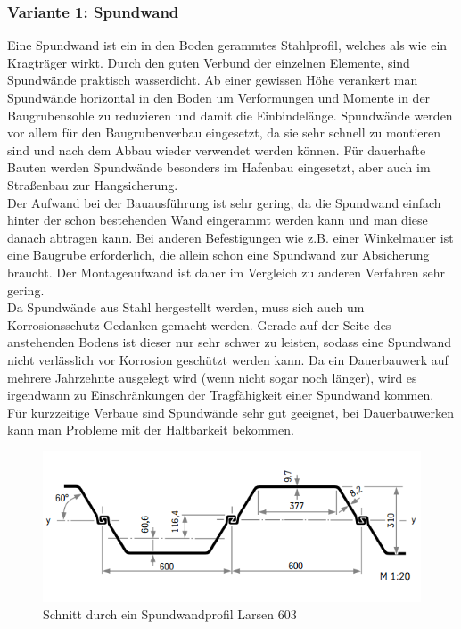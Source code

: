 \documentclass[11pt,fleqn,a4paper,halfparskip]{article}
\begin{document}
\subsubsection*{Variante 1: Spundwand} 
Eine Spundwand ist ein in den Boden gerammtes Stahlprofil, welches als wie ein Kragträger wirkt. Durch den guten Verbund der einzelnen Elemente, sind Spundwände praktisch wasserdicht. Ab einer gewissen Höhe verankert man Spundwände horizontal in den Boden um Verformungen und Momente in der Baugrubensohle zu reduzieren und damit die Einbindelänge. Spundwände werden vor allem für den Baugrubenverbau eingesetzt, da sie sehr schnell zu montieren sind und nach dem Abbau wieder verwendet werden können. Für dauerhafte Bauten werden Spundwände besonders im Hafenbau eingesetzt, aber auch im Straßenbau zur Hangsicherung. \\
Der Aufwand bei der Bauausführung ist sehr gering, da die Spundwand einfach hinter der schon bestehenden Wand eingerammt werden kann und man diese danach abtragen kann. Bei anderen Befestigungen wie z.B. einer Winkelmauer ist eine Baugrube erforderlich, die allein schon eine Spundwand zur Absicherung braucht. Der Montageaufwand ist daher im Vergleich zu anderen Verfahren sehr gering. \\
Da Spundwände aus Stahl hergestellt werden, muss sich auch um Korrosionsschutz Gedanken gemacht werden. Gerade auf der Seite des anstehenden Bodens ist dieser nur sehr schwer zu leisten, sodass eine Spundwand nicht verlässlich vor Korrosion geschützt werden kann. Da ein Dauerbauwerk auf mehrere Jahrzehnte ausgelegt wird (wenn nicht sogar noch länger), wird es irgendwann zu Einschränkungen der Tragfähigkeit einer Spundwand kommen. \\
Für kurzzeitige Verbaue sind Spundwände sehr gut geeignet, bei Dauerbauwerken kann man Probleme mit der Haltbarkeit bekommen.
\newpage
\begin{figure}[h]
\includegraphics[scale=0.5]{Spundwandschnitt.png}
\caption{Schnitt durch ein Spundwandprofil Larsen 603 \cite[2.1.1 S.10]{spund}}
\end{figure}
\end{document}
